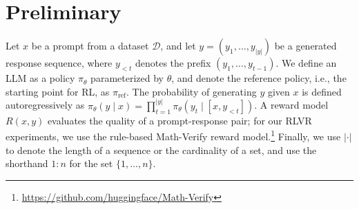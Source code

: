 \section{Preliminary}\label{sec:prelim}
Let $x$ be a prompt from a dataset $\mathcal{D}$, and let $y = (y_1, \dots, y_{|y|})$ be a generated response sequence, where $y_{<t}$ denotes the prefix $(y_1, \dots, y_{t-1})$. We define an LLM as a policy $\pi_\theta$ parameterized by $\theta$, and denote the reference policy, i.e., the starting point for RL, as $\pi_{\mathrm{ref}}$. The probability of generating $y$ given $x$ is defined autoregressively as $\pi_\theta(y \mid x) = \prod_{t=1}^{|y|} \pi_\theta(y_t \mid [x, y_{<t}])$. A reward model $R(x, y)$ evaluates the quality of a prompt-response pair; for our RLVR experiments, we use the rule-based Math-Verify reward model.\footnote{\url{https://github.com/huggingface/Math-Verify}} Finally, we use $|\cdot|$ to denote the length of a sequence or the cardinality of a set, and use the shorthand $1:n$ for the set $\{1, \dots, n\}$.
%


